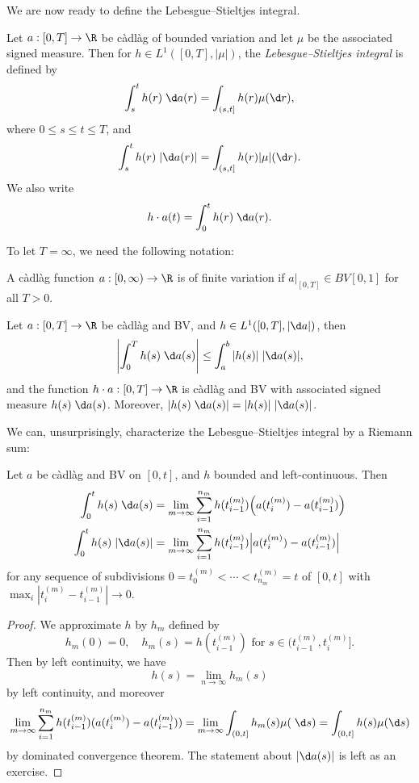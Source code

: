 \documentclass[a4paper]{article}
\begin{document}
We are now ready to define the Lebesgue--Stieltjes integral.

\begin{defi}
  Let $a: [0, T] \to \R$ be c\`adl\`ag of bounded variation and let $\mu$ be the associated signed measure. Then for $h \in L^1([0, T], |\mu|)$, the \emph{Lebesgue--Stieltjes integral} is defined by
  \[
    \int_s^t h(r)\; \d a(r) = \int_{(s, t]} h(r) \mu (\d r),
  \]
  where $0 \leq s \leq t \leq T$, and
  \[
    \int_s^t h(r)\; |\d a(r)| = \int_{(s, t]} h(r) |\mu| (\d r).
  \]
  We also write
  \[
    h \cdot a(t) = \int_0^t h(r) \;\d a(r).
  \]
\end{defi}

To let $T = \infty$, we need the following notation:
\begin{defi}
  A c\`adl\`ag function $a: [0, \infty) \to \R$ is of finite variation if $a|_{[0, T]} \in BV[0, 1]$ for all $T > 0$.
\end{defi}

\begin{fact}
  Let $a: [0, T] \to \R$ be c\`adl\`ag and BV, and $h \in L^1([0, T], |\d a|)$, then
  \[
    \left|\int_0^T h(s) \;\d a (s) \right| \leq \int_a^b |h(s)|\;|\d a(s)|,
  \]
  and the function $h \cdot a: [0, T] \to \R$ is c\`adl\`ag and BV with associated signed measure $h(s) \;\d a(s)$. Moreover, $|h(s) \;\d a(s)| = |h(s)|\;|\d a(s)|$.
\end{fact}

We can, unsurprisingly, characterize the Lebesgue--Stieltjes integral by a Riemann sum:
\begin{prop}
  Let $a$ be c\`adl\`ag and BV on $[0, t]$, and $h$ bounded and left-continuous. Then
  \begin{align*}
    \int_0^t h(s) \;\d a(s) &= \lim_{m \to \infty} \sum_{i = 1}^{n_m} h(t_{i - 1}^{(m)}) \Big(a (t_i^{(m)}) - a(t_{i - 1}^{(m)})\Big)\\
    \int_0^t h(s) \;|\d a(s)| &= \lim_{m \to \infty} \sum_{i = 1}^{n_m} h(t_{i - 1}^{(m)}) \Big|a (t_i^{(m)}) - a(t_{i - 1}^{(m)})\Big|
  \end{align*}
  for any sequence of subdivisions $0 = t_0^{(m)} < \cdots < t_{n_m}^{(m)} = t$ of $[0, t]$ with $\max_i |t_i^{(m)} - t_{i - 1}^{(m)}| \to 0$.
\end{prop}

\begin{proof}
  We approximate $h$ by $h_m$ defined by
  \[
    h_m(0) = 0,\quad h_m(s) = h(t_{i - 1}^{(m)})\text{ for }s \in (t_{i - 1}^{(m)}, t_i^{(m)}].
  \]
  Then by left continuity, we have
  \[
    h(s) = \lim_{n \to \infty}h_m(s)
  \]
  by left continuity, and moreover
  \[
    \lim_{m \to \infty} \sum_{i = 1}^{n_m} h(t_{i - 1}^{(m)}) (a(t_i^{(m)}) - a(t_{i - 1}^{(m)})) = \lim_{m \to \infty} \int_{(0, t]} h_m(s) \mu (\;\d s) = \int_{(0, t]} h(s) \mu(\d s)
  \]
  by dominated convergence theorem. The statement about $|\d a(s)|$ is left as an exercise.
\end{proof}
\end{document}
